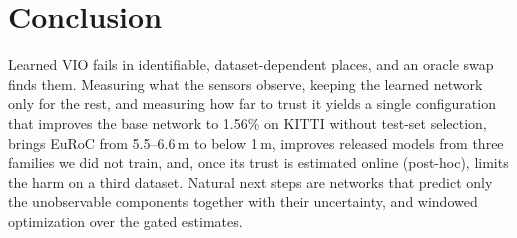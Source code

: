 \documentclass[letterpaper,journal]{IEEEtran}
\begin{document}
\section{Conclusion}

Learned VIO fails in identifiable, dataset-dependent places, and an oracle swap finds them. Measuring what the sensors observe, keeping the learned network only for the rest, and measuring how far to trust it yields a single configuration that improves the base network to 1.56\% on KITTI without test-set selection, brings EuRoC from 5.5--6.6\,m to below 1\,m, improves released models from three families we did not train, and, once its trust is estimated online (post-hoc), limits the harm on a third dataset. Natural next steps are networks that predict only the unobservable components together with their uncertainty, and windowed optimization over the gated estimates.



\end{document}
